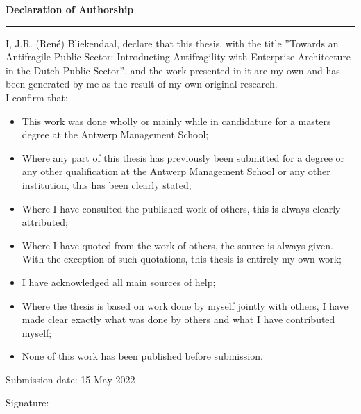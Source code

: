 \thispagestyle{plain}
\vspace*{\fill}
\LARGE
\noindent \textbf{Declaration of Authorship}
\hrule
\normalsize
\bigskip
\noindent
I, J.R. (René) Bliekendaal, declare that this thesis, with the title ''Towards an Antifragile Public Sector: Introducting Antifragility with Enterprise Architecture in the Dutch Public Sector'', and the work presented in it are my own and has been generated by me as the result of my own original research.\\

\noindent I confirm that:
\begin{itemize}
	\item{This work was done wholly or mainly while in candidature for a masters degree at the Antwerp Management School;}
	\item{Where any part of this thesis has previously been submitted for a degree or any other qualification at the Antwerp Management School or any other institution, this has been clearly stated;}
	\item{Where I have consulted the published work of others, this is always clearly attributed;}
	\item{Where I have quoted from the work of others, the source is always given. With the exception of such quotations, this thesis is entirely my own work;}
	\item{I have acknowledged all main sources of help;}
	\item{Where the thesis is based on work done by myself jointly with others, I have made clear exactly what was done by others and what I have contributed myself;}
	\item{None of this work has been published before submission.}
\end{itemize}
\bigskip

\noindent
Submission date: 15 May 2022
\bigskip

\noindent Signature: \makebox[2in]{\hrulefill}\\
\vspace*{\fill}
